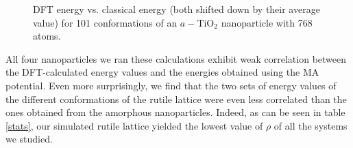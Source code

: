 \documentclass[aps,prb,twocolumn,amsmath,amssymb,superscriptaddress,longbibliography]{revtex4-1}
\newcommand\tab[1][1cm]{\hspace*{#1}} %
\begin{document}
\begin{figure}[htb]
\caption{DFT energy vs. classical energy (both shifted down by their average value) for 101 conformations of an $a-\text{TiO}_2$ nanoparticle with 768 atoms.}
\label{nnp_768}
\end{figure}
  
\tab All four nanoparticles we ran these calculations exhibit weak correlation between the DFT-calculated energy values and the energies obtained using the MA potential. 
Even more surprisingly, we find that the two sets of energy values of the different conformations of the rutile lattice were even less correlated than the ones obtained from the amorphous nanoparticles. 
Indeed, as can be seen in table \ref{stats}, our simulated rutile lattice yielded the lowest value of $\rho$ of all the systems we studied.
\end{document}
